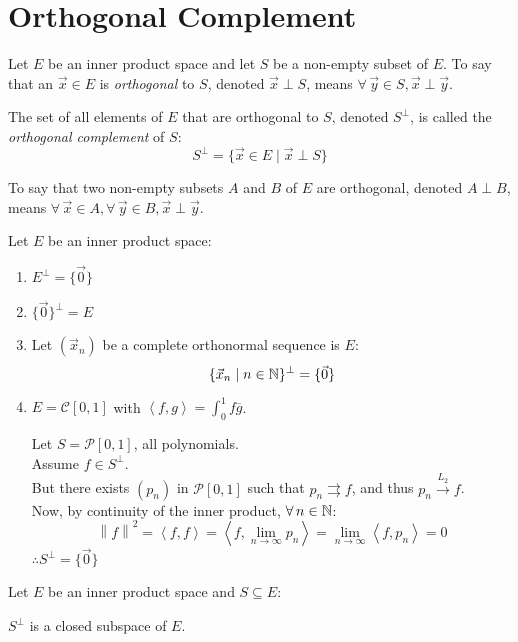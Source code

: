 \documentclass[letterpaper,12pt,fleqn]{article}
\newcommand{\vx}{\vec{x}}
\newcommand{\vy}{\vec{y}}
\newcommand{\vo}{\vec{0}}
\newcommand{\zs}{\{\vo\}}
\newcommand{\Sp}{S^{\perp}}
\newcommand{\mc}{\mathcal{C}}
\renewcommand{\mp}{\mathcal{P}}
\newcommand{\norm}[1]{\left\|#1\right\|}
\newcommand{\inner}[1]{\left<#1\right>}
\newcommand{\conj}[1]{\overline{#1}}
\begin{document}
\section*{Orthogonal Complement}

\begin{definition}
  Let $E$ be an inner product space and let $S$ be a non-empty subset of $E$.
  To say that an $\vx\in E$ is \emph{orthogonal} to $S$, denoted $\vx\perp S$,
  means $\forall\,\vy\in S,\vx\perp\vy$.

  The set of all elements of $E$ that are orthogonal to $S$, denoted $\Sp$, is
  called the \emph{orthogonal complement} of $S$:
  \[\Sp=\{\vx\in E\mid\vx\perp S\}\]

  To say that two non-empty subsets $A$ and $B$ of $E$ are orthogonal, denoted
  $A\perp B$, means $\forall\,\vx\in A,\forall\,\vy\in B,\vx\perp\vy$.
\end{definition}

\begin{examples}
  Let $E$ be an inner product space:
  \begin{enumerate}
  \item $E^{\perp}=\{\vo\}$

  \item $\zs^{\perp}=E$

  \item Let $(\vx_n)$ be a complete orthonormal sequence is $E$:
    \[\{\vx_n\mid n\in\N\}^{\perp}=\{\vo\}\]

  \item $E=\mc[0,1]$ with $\inner{f,g}=\int_0^1f\conj{g}$.

    Let $S=\mp[0,1]$, all polynomials. \\
    Assume $f\in\Sp$. \\
    But there exists $(p_n)$ in $\mp[0,1]$ such that $p_n\rightrightarrows f$,
    and thus $p_n\overset{L_2}{\rightarrow}f$. \\
    Now, by continuity of the inner product, $\forall\,n\in\mathbb{N}$:
    \[\norm{f}^2=\inner{f,f}=\inner{f,\lim_{n\to\infty}p_n}=
    \lim_{n\to\infty}\inner{f,p_n}=0\]
    $\therefore\Sp=\zs$
  \end{enumerate}
\end{examples}

\begin{theorem}
  Let $E$ be an inner product space and $S\subseteq E$:

  \qquad$\Sp$ is a closed subspace of $E$.
\end{theorem}
\end{document}

